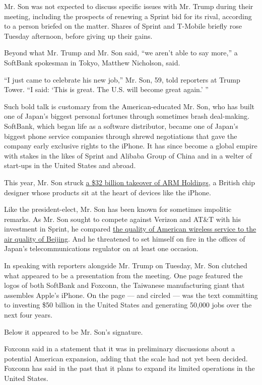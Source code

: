 Mr. Son was not expected to discuss specific issues with Mr. Trump
during their meeting, including the prospects of renewing a Sprint bid
for its rival, according to a person briefed on the matter. Shares of
Sprint and T-Mobile briefly rose Tuesday afternoon, before giving up
their gains.

Beyond what Mr. Trump and Mr. Son said, ``we aren't able to say more,''
a SoftBank spokesman in Tokyo, Matthew Nicholson, said.

``I just came to celebrate his new job,'' Mr. Son, 59, told reporters at
Trump Tower. ``I said: `This is great. The U.S. will become great
again.' ''

Such bold talk is customary from the American-educated Mr. Son, who has
built one of Japan's biggest personal fortunes through sometimes brash
deal-making. SoftBank, which began life as a software distributor,
became one of Japan's biggest phone service companies through shrewd
negotiations that gave the company early exclusive rights to the iPhone.
It has since become a global empire with stakes in the likes of Sprint
and Alibaba Group of China and in a welter of start-ups in the United
States and abroad.

This year, Mr. Son struck
\href{https://www.nytimes.com/2016/07/19/business/dealbook/softbank-buys-chip-designer-arm.html}{a
\$32 billion takeover of ARM Holdings}, a British chip designer whose
products sit at the heart of devices like the iPhone.

Like the president-elect, Mr. Son has been known for sometimes impolitic
remarks. As Mr. Son sought to compete against Verizon and AT\&T with his
investment in Sprint, he compared
\href{http://dealbook.nytimes.com/2014/06/05/the-biggest-champion-of-a-sprint-t-mobile-deal-softbanks-chief/}{the
quality of American wireless service to the air quality of Beijing}. And
he threatened to set himself on fire in the offices of Japan's
telecommunications regulator on at least one occasion.

In speaking with reporters alongside Mr. Trump on Tuesday, Mr. Son
clutched what appeared to be a presentation from the meeting. One page
featured the logos of both SoftBank and Foxconn, the Taiwanese
manufacturing giant that assembles Apple's iPhone. On the page --- and
circled --- was the text committing to investing \$50 billion in the
United States and generating 50,000 jobs over the next four years.

Below it appeared to be Mr. Son's signature.

Foxconn said in a statement that it was in preliminary discussions about
a potential American expansion, adding that the scale had not yet been
decided. Foxconn has said in the past that it plans to expand its
limited operations in the United States.

